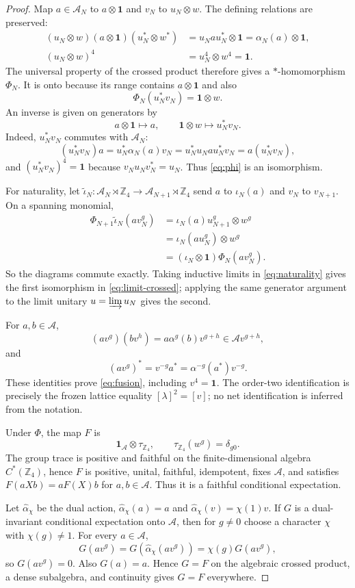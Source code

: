 \documentclass[11pt]{article}
\theoremstyle{remark}
\newcommand{\id}{\mathbf 1}
\newcommand{\A}{\mathcal A}
\begin{document}
\begin{proof}
Map $a\in\A_N$ to $a\otimes\id$ and $v_N$ to $u_N\otimes w$.
The defining relations are preserved:
\[
\begin{aligned}
(u_N\otimes w)(a\otimes\id)(u_N^*\otimes w^*)
 &=u_Nau_N^*\otimes\id=\alpha_N(a)\otimes\id,\\
(u_N\otimes w)^4&=u_N^4\otimes w^4=\id.
\end{aligned}
\]
The universal property of the crossed product therefore gives a
$*$-homomorphism $\Phi_N$.  It is onto because its range contains
$a\otimes\id$ and also
\[
 \Phi_N(u_N^*v_N)=\id\otimes w.
\]
An inverse is given on generators by
\[
 a\otimes\id\longmapsto a,\qquad
 \id\otimes w\longmapsto u_N^*v_N.
\]
Indeed, $u_N^*v_N$ commutes with $\A_N$:
\[
 (u_N^*v_N)a
 =u_N^*\alpha_N(a)v_N
 =u_N^*u_Nau_N^*v_N
 =a(u_N^*v_N),
\]
and $(u_N^*v_N)^4=\id$ because $v_Nu_Nv_N^*=u_N$.
Thus \eqref{eq:phi} is an isomorphism.

For naturality, let
$\widetilde\iota_N:\A_N\rtimes\mathbb Z_4
\to\A_{N+1}\rtimes\mathbb Z_4$
send $a$ to $\iota_N(a)$ and $v_N$ to $v_{N+1}$.  On a spanning
monomial,
\[
\begin{aligned}
\Phi_{N+1}\widetilde\iota_N(av_N^g)
 &=\iota_N(a)u_{N+1}^g\otimes w^g\\
 &=\iota_N(au_N^g)\otimes w^g\\
 &=(\iota_N\otimes\id)\Phi_N(av_N^g).
\end{aligned}
\tag{4.7}\label{eq:naturality}
\]
So the diagrams commute exactly.  Taking inductive limits in
\eqref{eq:naturality} gives the first isomorphism in
\eqref{eq:limit-crossed}; applying the same generator argument to the
limit unitary $u=\varinjlim u_N$ gives the second.

For $a,b\in\A$,
\[
 (av^g)(bv^h)=a\alpha^g(b)v^{g+h}\in\A v^{g+h},
\]
and
\[
 (av^g)^*=v^{-g}a^*=\alpha^{-g}(a^*)v^{-g}.
\]
These identities prove \eqref{eq:fusion}, including $v^4=\id$.
The order-two identification is precisely the frozen lattice equality
$[\lambda]^2=[v]$; no net identification is inferred from the notation.

Under $\Phi$, the map $F$ is
\[
 \id_\A\otimes\tau_{\mathbb Z_4},
\qquad
\tau_{\mathbb Z_4}(w^g)=\delta_{g0}.
\]
The group trace is positive and faithful on the finite-dimensional
algebra $C^*(\mathbb Z_4)$, hence $F$ is positive, unital, faithful,
idempotent, fixes $\A$, and satisfies
$F(aXb)=aF(X)b$ for $a,b\in\A$.  Thus it is a faithful conditional
expectation.

Let $\widehat\alpha_\chi$ be the dual action,
$\widehat\alpha_\chi(a)=a$ and
$\widehat\alpha_\chi(v)=\chi(1)v$.  If $G$ is a dual-invariant
conditional expectation onto $\A$, then for $g\ne0$ choose a character
$\chi$ with $\chi(g)\ne1$.  For every $a\in\A$,
\[
 G(av^g)
 =G(\widehat\alpha_\chi(av^g))
 =\chi(g)G(av^g),
\]
so $G(av^g)=0$.  Also $G(a)=a$.  Hence $G=F$ on the algebraic crossed
product, a dense subalgebra, and continuity gives $G=F$ everywhere.


\end{proof}
\end{document}
